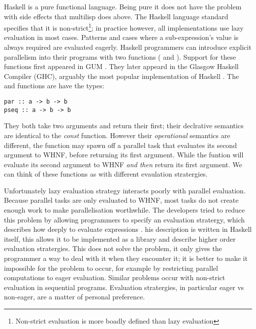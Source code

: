 Haskell is a pure functional language.
Being pure it does not have the problem with side effects that multilisp
does above.
The Haskell language standard specifies that it is non-strict\footnote{
    Non-strict evaluation is more boadly defined than lazy evaluation};
in practice however, all implementations use lazy evaluation in most cases.
Patterns and cases where a sub-expression's value is always required are
evaluated eagerly.
Haskell programmers can introduce explicit parallelism into their programs
with two functions ( and ).
Support for these functions first appeared in GUM
\citep{gph:gum,loidi:2008:gph-semiexplicit-parallelism}.
They later appeard in the Glasgow Haskell Compiler (GHC),
arguably the most popular implementation of Haskell
\citep{harris:2005:haskell-smp}.
The  and  functions are have the types:

\begin{verbatim}
par :: a -> b -> b
pseq :: a -> b -> b
\end{verbatim}
They both take two arguments and return their first;
their declrative semantics are identical to the \emph{const} function.
However their \emph{operational} semantics are different,
the  function may spawn off a parallel task that evaluates its
second argument to WHNF,
before returning its first argument.
While the  funtion will evaluate its second argument to WHNF
\emph{and then} return its first argument.
We can think of these functions as  with different evaulation
stratergies.

Unfortunately lazy evaluation strategy interacts poorly with
parallel evaluation.
Because parallel tasks are only evaluated to WHNF,
most tasks do not create enough work to make parallelisation worthwhile.
The developers tried to reduce this problem by allowing programmers to
specify an evaluation stratergy,
which describes how deeply to evaluate expressions \citep{trinder:98:strategies}.
his description is written in Haskell itself,
this allows it to be implemented as a library and describe higher order
evaluation stratergies.
This does not solve the problem,
it only gives the programmer a way to deal with it when they encounter it;
it is better to make it impossible for the problem to occur,
for example by restricting parallel computations to eager evaluation.
Similar problems occur with non-strict evaluation in sequential programs.
Evaluation stratergies, in particular eager vs non-eager,
are a matter of personal preference.

